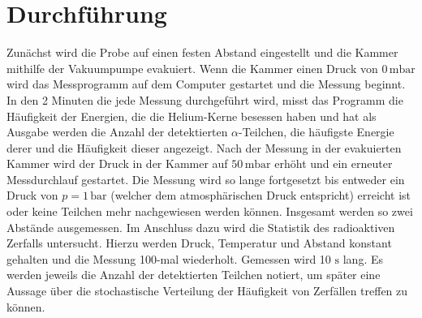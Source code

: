 \section{Durchführung}
\label{sec:Durchführung}

Zunächst wird die Probe auf einen festen Abstand eingestellt und  die Kammer mithilfe der Vakuumpumpe evakuiert.
Wenn die Kammer einen Druck von $0\,\text{m}\unit{\bar}$ wird das Messprogramm auf dem Computer gestartet und die Messung beginnt. 
In den 2 Minuten die jede Messung durchgeführt wird, misst das Programm die Häufigkeit der Energien, die die Helium-Kerne besessen haben und hat als Ausgabe werden die Anzahl der 
detektierten $\alpha$-Teilchen, die häufigste Energie derer und die Häufigkeit dieser angezeigt.
Nach der Messung in der evakuierten Kammer wird der Druck in der Kammer auf $50\, \text{m}\unit{\bar}$ erhöht und ein erneuter Messdurchlauf gestartet.
Die Messung wird so lange fortgesetzt bis entweder ein Druck von $p= 1\, \unit{\bar}$ (welcher dem atmosphärischen Druck entspricht) erreicht ist oder keine Teilchen mehr nachgewiesen werden können.
Insgesamt werden so zwei Abstände ausgemessen.
Im Anschluss dazu wird die Statistik des radioaktiven Zerfalls untersucht.
Hierzu werden Druck, Temperatur und Abstand konstant gehalten und die Messung 100-mal wiederholt.
Gemessen wird 10 $\unit{\second}$ lang.
Es werden jeweils die Anzahl der detektierten Teilchen notiert, um später eine Aussage über die stochastische Verteilung der Häufigkeit von Zerfällen treffen zu können.
